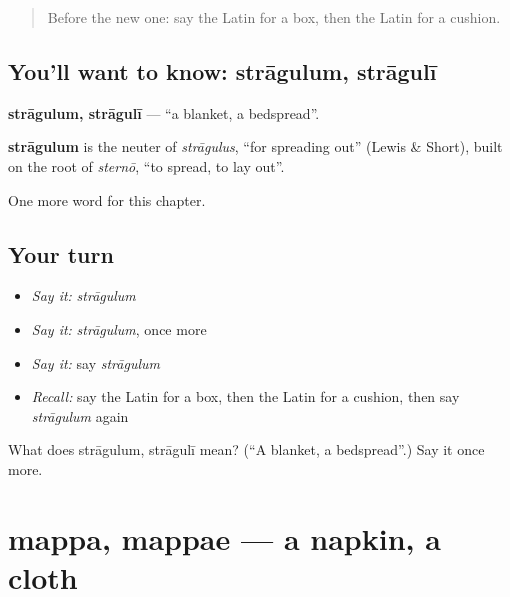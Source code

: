 \label{lesson:LA-C120-stragulum}



\begin{quote}
Before the new one: say the Latin for a box, then the Latin for a cushion.
\end{quote}

\subsection*{You'll want to know: strāgulum, strāgulī}
\textbf{strāgulum, strāgulī} — \textquotedblleft{}a blanket, a bedspread\textquotedblright{}.

\begin{cousinweb}
\textbf{strāgulum} is the neuter of \emph{strāgulus}, \textquotedblleft{}for spreading out\textquotedblright{} (Lewis \& Short), built on the root of \emph{sternō}, \textquotedblleft{}to spread, to lay out\textquotedblright{}.
\end{cousinweb}

\begin{grammarlens}[title={What you've built}]
One more word for this chapter.
\end{grammarlens}

\subsection*{Your turn}
\begin{itemize}
\raggedright
  \item \emph{Say it:} \emph{strāgulum}
  \item \emph{Say it:} \emph{strāgulum}, once more
  \item \emph{Say it:} say \emph{strāgulum}
  \item \emph{Recall:} say the Latin for a box, then the Latin for a cushion, then say \emph{strāgulum} again
\end{itemize}

\begin{tcolorbox}[breakable,colback=teal!4,colframe=teal!35!black,title={Before you move on}]
What does strāgulum, strāgulī mean? (\textquotedblleft{}A blanket, a bedspread\textquotedblright{}.) Say it once more.
\end{tcolorbox}
\section[mappa, mappae]{mappa, mappae — a napkin, a cloth}

